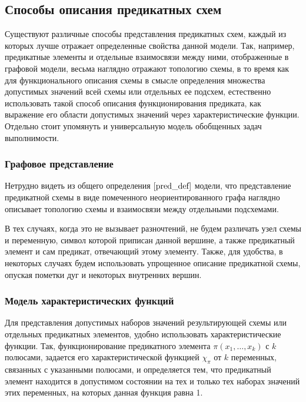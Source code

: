 \documentclass[12pt]{extarticle}
\begin{document}
\subsection{Способы описания предикатных схем}
Существуют различные способы представления предикатных схем, каждый из которых лучше отражает определенные свойства данной 
модели. Так, например, предикатные элементы и отдельные взаимосвязи между ними, отображенные в графовой модели,
весьма наглядно отражают топологию схемы, в то время как для функционального описания схемы в смысле 
определения множества допустимых значений 
всей схемы или отдельных ее подсхем, естественно использовать такой способ описания функционирования предиката,
как выражение его области допустимых значений через характеристические функции. 
Отдельно стоит упомянуть и универсальную модель обобщенных задач выполнимости.

\subsubsection*{Графовое представление}

Нетрудно видеть из общего определения $\ref{pred_def}$ модели,
что представление предикатной схемы в виде помеченного неориентированного графа 
наглядно описывает топологию схемы и взаимосвязи 
между отдельными подсхемами.

В тех случаях, когда это не вызывает разночтений, не будем различать узел схемы и переменную, 
символ которой приписан данной вершине, а также предикатный элемент и сам предикат, отвечающий этому элементу. 
Также, для удобства, в некоторых случаях будем использовать упрощенное описание предикатной схемы, 
опуская пометки дуг и некоторых внутренних вершин.  

\subsubsection*{Модель характеристических функций}

Для представления допустимых наборов значений результирующей схемы или отдельных предикатных элементов, 
удобно использовать характеристические
функции. Так, функционирование предикатного элемента $\pi(x_1, \dots, x_k)$ с $k$ полюсами,
задается его характеристической функцией $\chi_{\pi}$ от $k$ переменных, 
связанных с указанными полюсами, и определяется тем, что предикатный элемент находится в допустимом состоянии на тех и 
только тех наборах значений этих переменных, на которых данная функция равна 1. 
\end{document}
